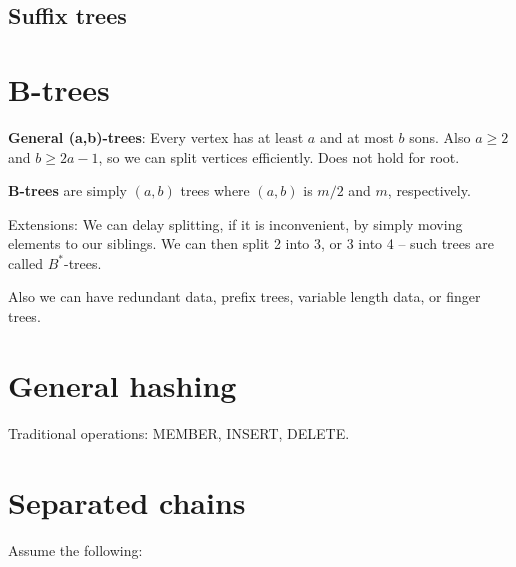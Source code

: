 \begin{multicols}{3}

\subsection{Suffix trees}


\section{B-trees}

{\bf General (a,b)-trees}: Every vertex has at least $a$ and at most $b$ sons. Also $a ≥ 2$ and $b ≥ 2a -1$,
so we can split vertices efficiently. Does not hold for root.


{\bf B-trees} are simply $(a,b)$ trees where $(a,b)$ is $m/2$ and $m$, respectively.

Extensions: We can delay splitting, if it is inconvenient, by simply moving elements to our siblings.
We can then split 2 into 3, or 3 into 4 -- such trees are called $B^*$-trees.

Also we can have redundant data, prefix trees, variable length data, or finger trees.

\section{General hashing}

Traditional operations: MEMBER, INSERT, DELETE.


\section{Separated chains}
Assume the following:


\end{multicols}
